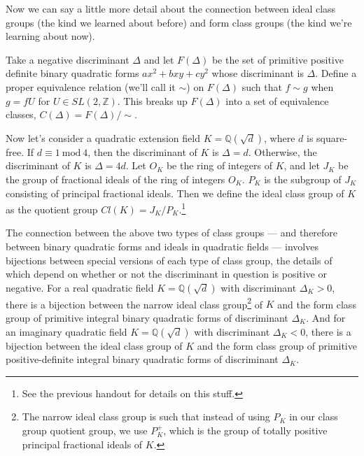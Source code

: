 \documentclass{article}
\theoremstyle{definition}
\theoremstyle{theorem}
\theoremstyle{example}
\theoremstyle{corollary}
\begin{document}
\bigskip

Now we can say a little more detail about the connection between ideal class groups (the kind we learned about before) and form class groups (the kind we're learning about now).

\bigskip

Take a negative discriminant \(\Delta\) and let \(F ( \Delta)\) be the set of primitive positive definite binary quadratic forms \(ax^{2} + b xy + c y^{2}\) whose discriminant is \(\Delta\). Define a proper equivalence relation (we'll call it \(\sim \)) on \(F (\Delta)\) such that \(f \sim g\) when \(g = fU\) for \(U \in SL(2, \mathbb{Z})\). This breaks up \(F (\Delta)\) into a set of equivalence classes, \(C(\Delta) = F(\Delta) / \sim\).

\bigskip

Now let's consider a quadratic extension field \(K = \mathbb{Q}(\sqrt{d})\), where \(d\) is square-free. If \(d \equiv 1 \ \textrm{mod} \ 4\), then the discriminant of \(K\) is \(\Delta = d\). Otherwise, the discriminant of \(K\) is \(\Delta = 4d\). Let \(O_{K}\) be the ring of integers of \(K\), and let \(J_{K}\) be the group of fractional ideals of the ring of integers \(O_{K}\). \(P_{K}\) is the subgroup of \(J_{K}\) consisting of principal fractional ideals. Then we define the ideal class group of \(K\) as the quotient group \(Cl(K) = J_{K} / P_{K}\).\footnote{See the previous handout for details on this stuff.}

\bigskip

The connection between the above two types of class groups --- and therefore between binary quadratic forms and ideals in quadratic fields --- involves bijections between special versions of each type of class group, the details of which depend on whether or not the discriminant in question is positive or negative. For a real quadratic field \(K = \mathbb{Q}(\sqrt{d})\) with discriminant \(\Delta_{K} > 0\), there is a bijection between the narrow ideal class group\footnote{The narrow ideal class group is such that instead of using \(P_{K}\) in our class group quotient group, we use \(P_{K}^{+}\), which is the group of totally positive principal fractional ideals of \(K\).} of \(K\) and the form class group of primitive integral binary quadratic forms of discriminant \(\Delta_{K}\). And for an imaginary quadratic field \(K = \mathbb{Q}(\sqrt{d})\) with discriminant \(\Delta_{K} < 0\), there is a bijection between the ideal class group of \(K\) and the form class group of primitive positive-definite integral binary quadratic forms of discriminant \(\Delta_{K}\).
\end{document}

